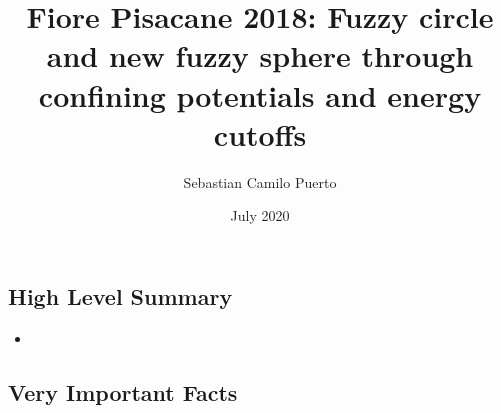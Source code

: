 \documentclass{article}
\title{Fiore Pisacane 2018: Fuzzy circle and new fuzzy sphere through confining potentials and energy cutoffs}
\author{Sebastian Camilo Puerto}
\date{July 2020}
\begin{document}
\maketitle

\tableofcontents

\subsection{High Level Summary}

    \begin{itemize}

    \item 
    
    \end{itemize}

\subsection{Very Important Facts}
\end{document}
